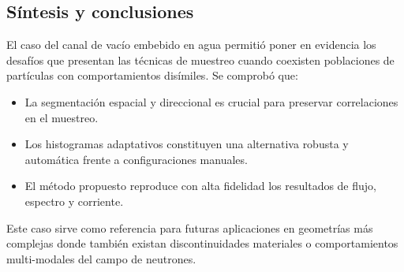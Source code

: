 
\subsection{Síntesis y conclusiones}

El caso del canal de vacío embebido en agua permitió poner en evidencia los desafíos que presentan las técnicas de muestreo cuando coexisten poblaciones de partículas con comportamientos disímiles. Se comprobó que:

\begin{itemize}
    \item La segmentación espacial y direccional es crucial para preservar correlaciones en el muestreo.
    \item Los histogramas adaptativos constituyen una alternativa robusta y automática frente a configuraciones manuales.
    \item El método propuesto reproduce con alta fidelidad los resultados de flujo, espectro y corriente.
\end{itemize}

Este caso sirve como referencia para futuras aplicaciones en geometrías más complejas donde también existan discontinuidades materiales o comportamientos multi-modales del campo de neutrones.

